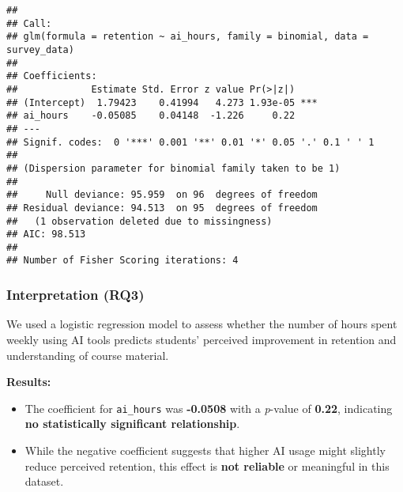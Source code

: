 \documentclass[
]{article}
\newenvironment{Shaded}{\begin{snugshade}}{\end{snugshade}}
\newcommand{\AttributeTok}[1]{\textcolor[rgb]{0.13,0.29,0.53}{#1}}
\newcommand{\CommentTok}[1]{\textcolor[rgb]{0.56,0.35,0.01}{\textit{#1}}}
\newcommand{\FunctionTok}[1]{\textcolor[rgb]{0.13,0.29,0.53}{\textbf{#1}}}
\newcommand{\NormalTok}[1]{#1}
\newcommand{\OtherTok}[1]{\textcolor[rgb]{0.56,0.35,0.01}{#1}}
\newcommand{\SpecialCharTok}[1]{\textcolor[rgb]{0.81,0.36,0.00}{\textbf{#1}}}
\providecommand{\tightlist}{%
  \setlength{\itemsep}{0pt}\setlength{\parskip}{0pt}}
\begin{document}
\begin{Shaded}
\end{Shaded}

\begin{verbatim}
## 
## Call:
## glm(formula = retention ~ ai_hours, family = binomial, data = survey_data)
## 
## Coefficients:
##             Estimate Std. Error z value Pr(>|z|)    
## (Intercept)  1.79423    0.41994   4.273 1.93e-05 ***
## ai_hours    -0.05085    0.04148  -1.226     0.22    
## ---
## Signif. codes:  0 '***' 0.001 '**' 0.01 '*' 0.05 '.' 0.1 ' ' 1
## 
## (Dispersion parameter for binomial family taken to be 1)
## 
##     Null deviance: 95.959  on 96  degrees of freedom
## Residual deviance: 94.513  on 95  degrees of freedom
##   (1 observation deleted due to missingness)
## AIC: 98.513
## 
## Number of Fisher Scoring iterations: 4
\end{verbatim}

\subsubsection{Interpretation (RQ3)}\label{interpretation-rq3}

We used a logistic regression model to assess whether the number of
hours spent weekly using AI tools predicts students' perceived
improvement in retention and understanding of course material.

\textbf{Results:}

\begin{itemize}
\tightlist
\item
  The coefficient for \texttt{ai\_hours} was \textbf{-0.0508} with a
  \emph{p}-value of \textbf{0.22}, indicating \textbf{no statistically
  significant relationship}.
\item
  While the negative coefficient suggests that higher AI usage might
  slightly reduce perceived retention, this effect is \textbf{not
  reliable} or meaningful in this dataset.
\end{itemize}
\end{document}
